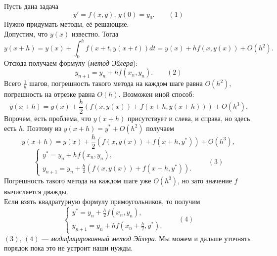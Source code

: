 Пусть дана задача 
$$y'=f(x,y), \, y(0)=y_0. \qquad (1)$$
Нужно придумать методы, её решающие.\\
Допустим, что $y(x)$ известно. Тогда
$$y(x+h) = y(x) + \int_0^h f(x+t, y(x+t))dt = y(x) + hf(x, y(x)) + O(h^2).$$
Отсюда получаем формулу (\emph{метод Эйлера}):
$$y_{n+1} = y_n + hf(x_n, y_n). \qquad (2)$$
Всего $\frac{1}{h}$ шагов, погрешность такого метода на каждом шаге равна $O(h^2)$, погрешность на отрезке равна $O(h)$.
Возможен иной способ:
$$y(x+h) = y(x) + \frac{h}{2}\left( f(x, y(x)) + f(x+h, y(x+h)) \right) + O(h^3).$$
Впрочем, есть проблема, что $y(x+h)$ присутствует и слева, и справа, но здесь есть $h$. Поэтому из $y(x+h)=y^\ast+O(h^2)$ получаем
$$y(x+h) = y(x) + \frac{h}{2}\left( f(x, y(x)) + f(x+h, y^\ast) \right) + O(h^3),$$
$$\begin{cases}
	y^\ast = y_n + hf(x_n, y_n), \\
	y_{n+1} = y_n + \frac{h}{2}\left( f(x, y(x)) + f(x+h, y^\ast) \right).
\end{cases} \qquad (3)$$
Погрешность такого метода на каждом шаге уже $O(h^3)$, но зато значение $f$ вычисляется дважды.\\
Если взять квадратурную формулу прямоугольников, то получим
$$\begin{cases}
	y^\ast = y_n + \frac{h}{2}f(x_n, y_n), \\
	y_{n+1} = y_n + hf\left( x_n+\frac{h}{2}, y^\ast \right).
\end{cases} \qquad (4)$$
$(3), \, (4)$ --- \emph{модифицированный метод Эйлера}. Мы можем и дальше уточнять порядок пока это не устроит наши нужды.

